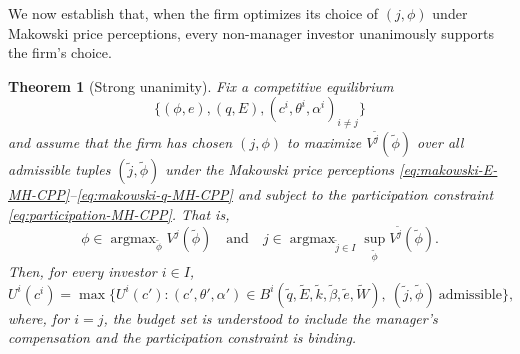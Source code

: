\documentclass[11pt,a4paper,oneside]{book}
\def\et{\quad \text{and} \quad}
\DeclareMathOperator*{\argmax}{argmax}
\theoremstyle{plain}
\newtheorem{theorem}{Theorem}[chapter]
\theoremstyle{definition}
\theoremstyle{remark}
\numberwithin{equation}{chapter}
\begin{document}
We now establish that, when the firm optimizes its choice of $(j, \phi)$ under Makowski price perceptions, every non-manager investor unanimously supports the firm's choice.

\begin{theorem}[Strong unanimity]\label{thm:unanimity-MH-CPP}
Fix a competitive equilibrium
\begin{equation*}
  \bigl\{ (\phi, e), (q, E), (c^i, \theta^i, \alpha^i)_{i \neq j} \bigr\}
\end{equation*}
and assume that the firm has chosen $(j, \phi)$ to maximize $V^{\widetilde{j}}(\widetilde{\phi})$ over all admissible tuples $(\widetilde{j}, \widetilde{\phi})$ under the Makowski price perceptions \eqref{eq:makowski-E-MH-CPP}--\eqref{eq:makowski-q-MH-CPP} and subject to the participation constraint \eqref{eq:participation-MH-CPP}.
That is,
\begin{equation*}
  \phi \in \argmax_{\widetilde{\phi}} V^j(\widetilde{\phi})
  \et
  j \in \argmax_{\widetilde{j} \in I} \sup_{\widetilde{\phi}} V^{\widetilde{j}}(\widetilde{\phi}).
\end{equation*}
Then, for every investor $i \in I$,
\begin{equation}\label{eq:strong-unanimity-MH-CPP}
  U^i(c^i) = \max \bigl\{ U^i(c') \colon (c', \theta', \alpha') \in B^i(\widetilde{q}, \widetilde{E}, \widetilde{k}, \widetilde{\beta}, \widetilde{e}, \widetilde{W}), \ (\widetilde{j}, \widetilde{\phi}) \ \text{admissible} \bigr\},
\end{equation}
where, for $i = j$, the budget set is understood to include the manager's compensation and the participation constraint is binding.
\end{theorem}
\end{document}
